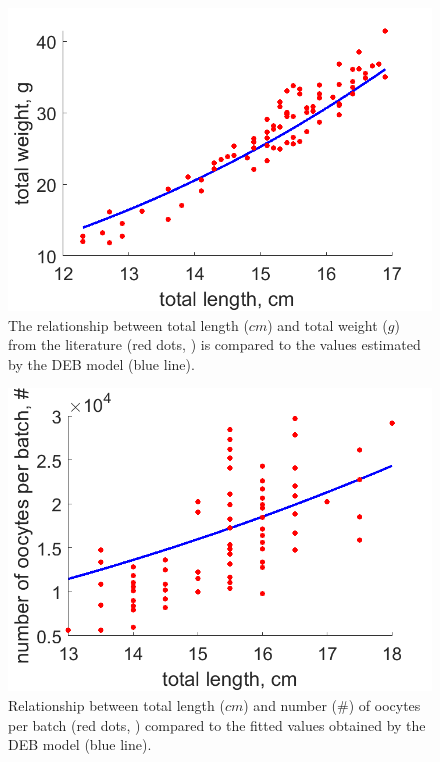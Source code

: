 \begin{figure}[ht]
	\includegraphics[width=1.0\textwidth]{figures/Chap4LengthVSWeight.png}
	\centering
	\caption{The relationship between total length ($cm$) and total weight ($g$) from the literature (red dots, \cite{Mina1968}) is compared to the values estimated by the DEB model (blue line).}
	\label{Chap4LengthVSWeight}
\end{figure}

\begin{figure}[ht]
	\includegraphics[width=1.0\textwidth]{figures/Chap4LengthVSOocytes.png}
	\centering
	\caption{Relationship between total length ($cm$) and number ($\#$) of oocytes per batch (red dots, \cite{PereBuit2000}) compared to the fitted values obtained by the DEB model (blue line).}
	\label{Chap4LengthVSOocytes}
\end{figure}

